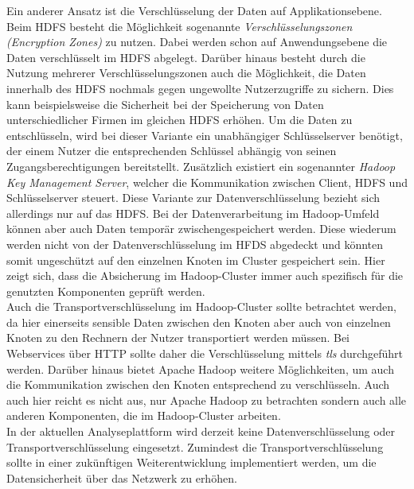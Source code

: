\noindent
Ein anderer Ansatz ist die Verschlüsselung der Daten auf Applikationsebene. Beim HDFS besteht die Möglichkeit sogenannte \textit{Verschlüsselungszonen (Encryption Zones)} zu nutzen. Dabei werden schon auf Anwendungsebene die Daten verschlüsselt im HDFS abgelegt. Darüber hinaus besteht durch die Nutzung mehrerer Verschlüsselungszonen auch die Möglichkeit, die Daten innerhalb des HDFS nochmals gegen ungewollte Nutzerzugriffe zu sichern. Dies kann beispielsweise die Sicherheit bei der Speicherung von Daten unterschiedlicher Firmen im gleichen HDFS erhöhen. Um die Daten zu entschlüsseln, wird bei dieser Variante ein unabhängiger Schlüsselserver benötigt, der einem Nutzer die entsprechenden Schlüssel abhängig von seinen Zugangsberechtigungen bereitstellt. Zusätzlich existiert ein sogenannter \textit{Hadoop Key Management Server}, welcher die Kommunikation zwischen Client, HDFS und Schlüsselserver steuert.\cite[S. 192-200]{hadoop_security}
Diese Variante zur Datenverschlüsselung bezieht sich allerdings nur auf das HDFS. Bei der Datenverarbeitung im Hadoop-Umfeld können aber auch Daten temporär zwischengespeichert werden. Diese wiederum werden nicht von der Datenverschlüsselung im HFDS abgedeckt und könnten somit ungeschützt auf den einzelnen Knoten im Cluster gespeichert sein. Hier zeigt sich, dass die Absicherung im Hadoop-Cluster immer auch spezifisch für die genutzten Komponenten geprüft werden. \\

\noindent
Auch die Transportverschlüsselung im Hadoop-Cluster sollte betrachtet werden, da hier einerseits sensible Daten zwischen den Knoten aber auch von einzelnen Knoten zu den Rechnern der Nutzer transportiert werden müssen. Bei Webservices über HTTP sollte daher die Verschlüsselung mittels \textit{\gls{tls}} durchgeführt werden. Darüber hinaus bietet Apache Hadoop weitere Möglichkeiten, um auch die Kommunikation zwischen den Knoten entsprechend zu verschlüsseln. Auch auch hier reicht es nicht aus, nur Apache Hadoop zu betrachten sondern auch alle anderen Komponenten, die im Hadoop-Cluster arbeiten. \cite[S. 207-216]{hadoop_security}\\

\noindent
In der aktuellen Analyseplattform wird derzeit keine Datenverschlüsselung oder Transportverschlüsselung eingesetzt. Zumindest die Transportverschlüsselung sollte in einer zukünftigen Weiterentwicklung implementiert werden, um die Datensicherheit über das Netzwerk zu erhöhen.

